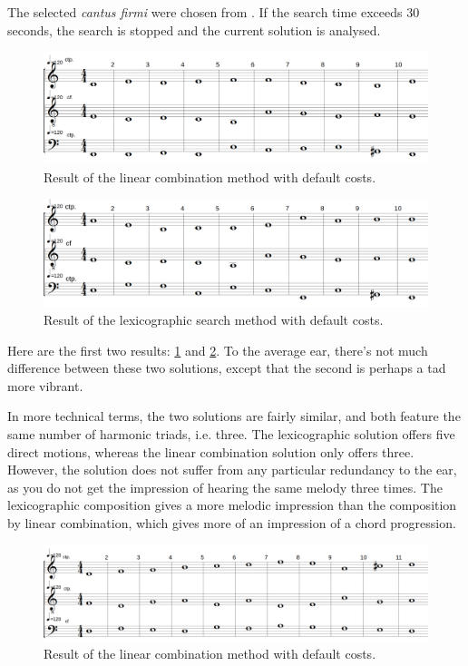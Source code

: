 The selected \textit{cantus firmi} were chosen from \gap. If the search time exceeds 30 seconds, the search is stopped and the current solution is analysed.

\begin{figure}[h]
    \centering
    \includegraphics[width=1\textwidth]{Images/Experiments/linear-combination-1sp0.png}
    \caption{Result of the linear combination method with default costs.}
    \label{fig:combili-1sp0}
\end{figure}

\begin{figure}[h]
    \centering
    \includegraphics[width=1\textwidth]{Images/Experiments/basic-lexico-1sp0.png}
    \caption{Result of the lexicographic search method with default costs.}
    \label{fig:lexico-1sp0}
\end{figure}

Here are the first two results: \ref{fig:combili-1sp0} and \ref{fig:lexico-1sp0}. To the average ear, there's not much difference between these two solutions, except that the second is perhaps a tad more vibrant.

In more technical terms, the two solutions are fairly similar, and both feature the same number of harmonic triads, i.e. three. The lexicographic solution offers five direct motions, whereas the linear combination solution only offers three. However, the solution does not suffer from any particular redundancy to the ear, as you do not get the impression of hearing the same melody three times. The lexicographic composition gives a more melodic impression than the composition by linear combination, which gives more of an impression of a chord progression.

\begin{figure}[h]
    \centering
    \includegraphics[width=1\textwidth]{Images/Experiments/linear-combination-1sp.png}
    \caption{Result of the linear combination method with default costs.}
    \label{fig:combili-1sp}
\end{figure}


